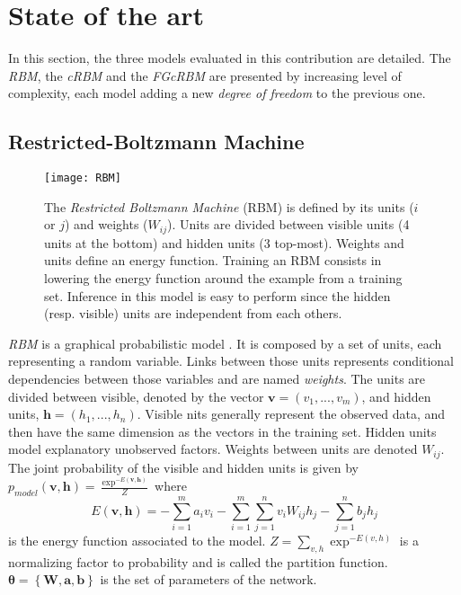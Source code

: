 \documentclass[letterpaper]{article}
\begin{document}
\section{State of the art}
\label{sec:state_of_the_art}
In this section, the three models evaluated in this contribution are detailed. The \textit{RBM}, the \textit{cRBM} and the \textit{FGcRBM} are presented by increasing level of complexity, each model adding a new \textit{degree of freedom} to the previous one.

\subsection{Restricted-Boltzmann Machine}
\begin{figure}
\centering
\texttt{[image: RBM]}
\caption{The \textit{Restricted Boltzmann Machine} (RBM) is defined by its units ($i$ or $j$) and weights ($W_{ij}$). Units are divided between visible units (4 units at the bottom) and hidden units (3 top-most). Weights and units define an energy function. Training an RBM consists in lowering the energy function around the example from a training set. Inference in this model is easy to perform since the hidden (resp. visible) units are independent from each others.}
\label{fig:RBM}
\end{figure}
\textit{RBM} \cite{Hinton:2006:FLA:1161603.1161605} is a graphical probabilistic model . It is composed by a set of units, each representing a random variable. Links between those units represents conditional dependencies between those variables and are named \textit{weights}. The units are divided between visible, denoted by the vector $\bm{v} = (v_{1},...,v_{m})$, and hidden units, $\bm{h} = (h_{1},...,h_{n})$. Visible nits generally represent the observed data, and then have the same dimension as the vectors in the training set. Hidden units model explanatory unobserved factors.
Weights between units are denoted $W_{ij}$. The joint probability of the visible and hidden units is given by $p_{model}(\bm{v},\bm{h}) = \frac{\exp^{-E(\bm{v},\bm{h})}}{Z}$ where
\begin{equation}
E(\bm{v},\bm{h}) = - \sum_{i=1}^{m} a_{i} v_{i}  - \sum_{i=1}^{m} \sum_{j=1}^{n} v_{i} W_{ij} h_{j} - \sum_{j = 1}^{n} b_{j} h_{j}
\end{equation}
is the energy function associated to the model. $Z = \sum_{v,h}\exp^{-E(v,h)}$ is a normalizing factor to probability and is called the partition function. $\bm{\theta} = \left\lbrace \bm{W} , \bm{a} , \bm{b} \right\rbrace$ is the set of parameters of the network.
\end{document}
